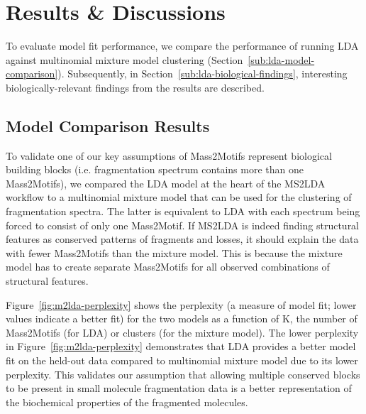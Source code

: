 \section{Results \& Discussions}

To evaluate model fit performance, we compare the performance of running LDA against multinomial mixture model clustering (Section~\ref{sub:lda-model-comparison}). Subsequently, in Section~\ref{sub:lda-biological-findings}, interesting biologically-relevant findings from the results are described.

\subsection{Model Comparison Results\label{sub:lda-model-comparison}}

To validate one of our key assumptions of Mass2Motifs represent biological building blocks (i.e. fragmentation spectrum contains more than one Mass2Motifs), we compared the LDA model at the heart of the MS2LDA workflow to a multinomial mixture model that can be used for the clustering of fragmentation spectra. The latter is equivalent to LDA with each spectrum being forced to consist of only one Mass2Motif. If MS2LDA is indeed finding structural features as conserved patterns of fragments and losses, it should explain the data with fewer Mass2Motifs than the mixture model. This is because the mixture model has to create separate Mass2Motifs for all observed combinations of structural features. 

Figure~\ref{fig:m2lda-perplexity} shows the perplexity (a measure of model fit; lower values indicate a better fit) for the two models as a function of K, the number of Mass2Motifs (for LDA) or clusters (for the mixture model). The lower perplexity in Figure~\ref{fig:m2lda-perplexity} demonstrates that LDA provides a better model fit on the held-out data compared to multinomial mixture model due to its lower perplexity. This validates our assumption that allowing multiple conserved blocks to be present in small molecule fragmentation data is a better representation of the biochemical properties of the fragmented molecules.

